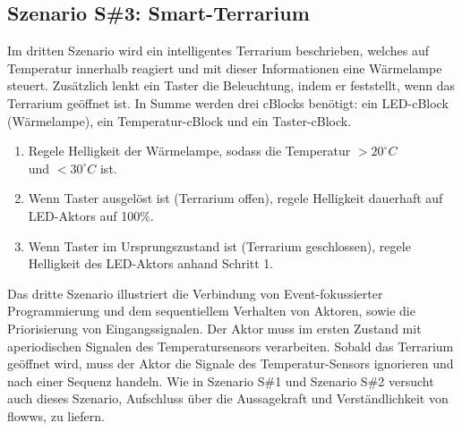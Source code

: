 \subsection{Szenario S\#3: Smart-Terrarium\label{szenario3}}
Im dritten  Szenario wird ein intelligentes Terrarium beschrieben, welches auf Temperatur innerhalb reagiert und mit dieser Informationen eine Wärmelampe steuert. Zusätzlich lenkt ein Taster die Beleuchtung, indem er feststellt, wenn das Terrarium geöffnet ist. In Summe werden drei cBlocks benötigt: ein LED-cBlock (Wärmelampe), ein Temperatur-cBlock und ein Taster-cBlock.
\begin{enumerate}
    \item Regele Helligkeit der Wärmelampe, sodass die Temperatur  $>20^{\circ}C$\\ und $<30^{\circ}C$ ist.
    \item Wenn Taster ausgelöst ist (Terrarium offen), regele Helligkeit dauerhaft auf LED-Aktors auf 100\%.
    \item Wenn Taster im Ursprungszustand ist (Terrarium geschlossen), regele Helligkeit des LED-Aktors anhand Schritt 1.
\end{enumerate}
Das dritte Szenario illustriert die Verbindung von Event-fokussierter Programmierung und dem sequentiellem Verhalten von Aktoren, sowie die Priorisierung von Eingangssignalen. Der Aktor muss im ersten Zustand mit aperiodischen Signalen des Temperatursensors verarbeiten. Sobald das Terrarium geöffnet wird, muss der Aktor die Signale des Temperatur-Sensors ignorieren und nach einer Sequenz handeln. Wie in Szenario S\#1 und Szenario S\#2 versucht auch dieses Szenario, Aufschluss über die Aussagekraft und Verständlichkeit von flowws, zu liefern.